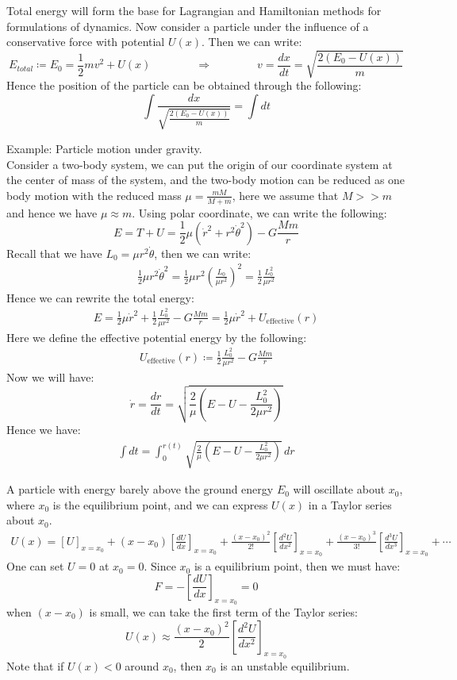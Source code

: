 \documentclass[11pt,oneside]{book}
\theoremstyle{break}
\theoremstyle{break}
\newcommand{\example}{\color{green}Example: \color{black}}
\begin{document}
\newpage
Total energy will form the base for Lagrangian and Hamiltonian methods for formulations of dynamics. Now consider a particle under the influence of a conservative force with potential $U(x)$. Then we can write:
$$E_{total} \coloneqq E_0 = \frac{1}{2}mv^2 + U(x) \qquad\qquad\Rightarrow\qquad\qquad v = \frac{dx}{dt} = \sqrt{\frac{2(E_0 - U(x))}{m}}$$
Hence the position of the particle can be obtained through the following:
$$\int \frac{dx}{\sqrt{\frac{2(E_0 - U(x))}{m}}} = \int dt$$


\hfill\break
\hfill\break
\example Particle motion under gravity. \\
Consider a two-body system, we can put the origin of our coordinate system at the center of mass of the system, and the two-body motion can be reduced as one body motion with the reduced mass $\mu = \frac{mM}{M+m}$, here we assume that $M>>m$ and hence we have $\mu \approx m$. Using polar coordinate, we can write the following:
$$E = T+U = \frac{1}{2}\mu (\dot{r}^2 + r^2 \dot{\theta}^2) - G\frac{Mm}{r}$$
Recall that we have $L_0 = \mu r^2 \dot{\theta}$, then we can write:
\begin{align*}
\frac{1}{2}\mu r^2 \dot{\theta}^2 = \frac{1}{2}\mu r^2 \left( \frac{L_0}{\mu r^2}\right)^2 = \frac{1}{2}\frac{L_0^2}{\mu r^2}
\end{align*}
Hence we can rewrite the total energy:
\begin{align*}
E = \frac{1}{2}\mu \dot{r}^2 + \frac{1}{2}\frac{L_0^2}{\mu r^2} - G\frac{Mm}{r} = \frac{1}{2}\mu \dot{r}^2 + U_{\text{effective}}(r)
\end{align*}
Here we define the effective potential energy by the following:
\begin{align*}
U_{\text{effective}}(r)\coloneqq \frac{1}{2}\frac{L_0^2}{\mu r^2} - G\frac{Mm}{r}
\end{align*}
Now we will have:
$$\dot{r} = \frac{dr}{dt} = \sqrt{\frac{2}{\mu}\left( E - U-\frac{L_0^2}{2\mu r^2}\right)}$$
Hence we have:
\begin{align*}
\int dt = \int_0^{r(t)}  \sqrt{\frac{2}{\mu}\left( E - U-\frac{L_0^2}{2\mu r^2}\right)}\, dr
\end{align*}

\hfill\break
\hfill\break
A particle with energy barely above the ground energy $E_0$ will oscillate about $x_0$, where $x_0$ is the equilibrium point, and we can express $U(x)$ in a Taylor series about $x_0$. 
\begin{align*}
U(x) = [U]_{x=x_0} + (x-x_0)\left[\frac{dU}{dx}\right]_{x= x_0} + \frac{(x-x_0)^2}{2!}\left[\frac{d^2 U}{dx^2}\right]_{x=x_0} + \frac{(x-x_0)^3}{3!}\left[\frac{d^3U}{dx^3}\right]_{x=x_0}+\cdots
\end{align*}
One can set $U = 0$ at $x_0 = 0$. Since $x_0$ is a equilibrium point, then we must have:
$$F = -\left[\frac{dU}{dx}\right]_{x=x_0} = 0$$
when $(x-x_0)$ is small, we can take the first term of the Taylor series:
$$U(x) \approx \frac{(x-x_0)^2}{2}\left[\frac{d^2 U}{dx^2}\right]_{x=x_0} $$
Note that if $U(x)<0$ around $x_0$, then $x_0$ is an unstable equilibrium.
\end{document}
